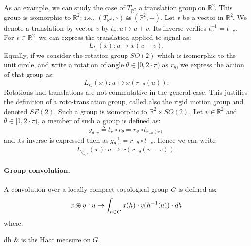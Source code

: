                 As an example, we can study the case of $T_{\mathbb{R}^2}$ a translation group on $\mathbb{R}^2$.
                This group is isomorphic to $\mathbb{R}^2$: i.e., $(T_{\mathbb{R}^2}, \circ) \cong (\mathbb{R}^2, +)$.
                Let $v$ be a vector in $\mathbb{R}^2$.
                We denote a translation by vector $v$ by $t_v: u \mapsto u + v$.
                Its inverse verifies $t_v^{-1} = t_{-v}$.
                For $v \in \mathbb{R}^2$, we can express the translation applied to signal as:
                \begin{equation}
                    \label{eq::action_translation}
                    L_{t_v}(x): u \mapsto x\left(u - v\right).
                \end{equation}
                Equally, if we consider the rotation group $SO(2)$ which is isomorphic to the unit circle, and write a rotation of angle $\theta \in [0, 2\cdot\pi)$ as $r_{\theta}$, we express the action of that group as:
                \begin{equation}
                    \label{eq::action_rotation}
                    L_{r_{\theta}}(x): u \mapsto x\left(r_{-\theta}(u)\right).
                \end{equation}
                Rotations and translations are not commutative in the general case.
                This justifies the definition of a roto-translation group, called also the rigid motion group and denoted $SE(2)$.
                Such a group is isomorphic to $\mathbb{R}^2 \times SO(2)$.
                Let $v \in \mathbb{R}^2$ and $\theta \in [0, 2\cdot\pi)$, a member of such a group is defined as:
                \begin{equation}
                    \label{eq::roto-translation}
                    g_{\theta, v} \triangleq t_v \circ r_{\theta} = r_{\theta} \circ t_{r_{-\theta}(v)}
                \end{equation}
                and its inverse is expressed then as $g_{\theta, v}^{-1} = r_{-\theta} \circ t_{-v}$.
                Hence we can write:
                \begin{equation}
                    \label{eq::action_roto-translation}
                    L_{g_{\theta, v}}(x): u \mapsto x \left(r_{-\theta}(u - v)\right).
                \end{equation}
            
            \paragraph{Group convolution.}
                A convolution over a locally compact topological group $G$ is defined as:
                \begin{equation}
                    \label{eq::group_signal_convolution}
                    x \ostar y: u \mapsto \int_{h\in G} x(h)\cdot y(h^{-1}(u)) \cdot dh
                \end{equation}
                where:
                \begin{conditions}
                    dh & is the Haar measure on $G$.
                \end{conditions}

